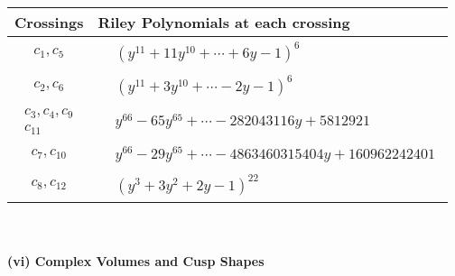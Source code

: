 \documentclass[1p]{elsarticle_modified}
\theoremstyle{definition}
\begin{document}
\begin{tabular}{m{50pt}|m{274pt}}
Crossings & \hspace{64pt}Riley Polynomials at each crossing \\
\hline $$\begin{aligned}c_{1},c_{5}\end{aligned}$$&$\begin{aligned}
&(y^{11}+11 y^{10}+\cdots+6 y-1)^{6}
\end{aligned}$\\
\hline $$\begin{aligned}c_{2},c_{6}\end{aligned}$$&$\begin{aligned}
&(y^{11}+3 y^{10}+\cdots-2 y-1)^{6}
\end{aligned}$\\
\hline $$\begin{aligned}c_{3},c_{4},c_{9}\\c_{11}\end{aligned}$$&$\begin{aligned}
&y^{66}-65 y^{65}+\cdots-282043116 y+5812921
\end{aligned}$\\
\hline $$\begin{aligned}c_{7},c_{10}\end{aligned}$$&$\begin{aligned}
&y^{66}-29 y^{65}+\cdots-4863460315404 y+160962242401
\end{aligned}$\\
\hline $$\begin{aligned}c_{8},c_{12}\end{aligned}$$&$\begin{aligned}
&(y^3+3 y^2+2 y-1)^{22}
\end{aligned}$\\
\hline
\end{tabular}\\~\\
\newpage\flushleft \textbf{(vi) Complex Volumes and Cusp Shapes}
\end{document}
